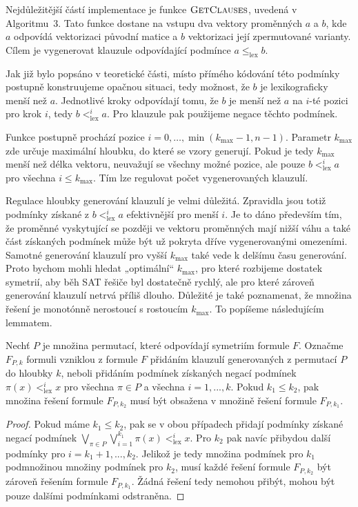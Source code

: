 Nejdůležitější částí implementace je funkce $\textproc{GetClauses}$, uvedená v Algoritmu 3. Tato funkce dostane na vstupu dva vektory proměnných $a$ a $b$, kde $a$ odpovídá vektorizaci původní matice a $b$ vektorizaci její zpermutované varianty. Cílem je vygenerovat klauzule odpovídající podmínce
$a \leq_{\text{lex}} b$.

Jak již bylo popsáno v teoretické části, místo přímého kódování této podmínky postupně konstruujeme opačnou situaci, tedy možnost, že $b$ je lexikograficky menší než $a$. Jednotlivé kroky odpovídají tomu, že $b$ je menší než $a$ na $i$-té pozici pro krok $i$, tedy $b <^i_{\text{lex}} a$. Pro klauzule pak použijeme negace těchto podmínek.

Funkce postupně prochází pozice $i = 0,\ldots,\min(k_{\max}-1,n-1)$. Parametr $k_{\max}$ zde určuje maximální hloubku, do které se vzory generují. Pokud je tedy $k_{\max}$ menší než délka vektoru, neuvažují se všechny možné pozice, ale pouze $b <^i_{\text{lex}} a$ pro všechna $i \leq k_{\max}$. Tím lze regulovat počet vygenerovaných klauzulí.

Regulace hloubky generování klauzulí je velmi důležitá. Zpravidla jsou totiž podmínky získané z $b <^i_{\text{lex}} a$ efektivnější pro menší $i$. Je to dáno především tím, že proměnné vyskytující se později ve vektoru proměnných mají nižší váhu a také část získaných podmínek může být už pokryta dříve vygenerovanými omezeními. Samotné generování klauzulí pro vyšší $k_{\max}$ také vede k delšímu času generování. Proto bychom mohli hledat „optimální“ $k_{\max}$, pro které rozbijeme dostatek symetrií, aby běh SAT řešiče byl dostatečně rychlý, ale pro které zároveň generování klauzulí netrvá příliš dlouho. Důležité je také poznamenat, že množina řešení je monotónně nerostoucí s rostoucím $k_{\max}$. To popíšeme následujícím lemmatem.

\begin{lemma}
Nechť $P$ je množina permutací, které odpovídají symetriím formule $F$. Označme $F_{P,k}$ formuli vzniklou z formule $F$ přidáním klauzulí generovaných z permutací $P$ do hloubky $k$, neboli přidáním podmínek získaných negací podmínek $\pi(x) <^i_{\text{lex}} x$ pro všechna $\pi \in P$ a všechna $i=1,...,k$. Pokud $k_1\leq k_2$, pak množina řešení formule $F_{P,k_2}$ musí být obsažena v množině řešení formule $F_{P,k_1}$.
\end{lemma}

\begin{proof}
Pokud máme $k_1\leq k_2$, pak se v obou případech přidají podmínky získané negací podmínek $\bigvee_{\pi \in P} \bigvee_{i=1}^{k_1} \pi(x) <_{\text{lex}}^{i} x$. Pro $k_2$ pak navíc přibydou další podmínky pro $i=k_1+1,...,k_2$. Jelikož je tedy množina podmínek pro $k_1$ podmnožinou množiny podmínek pro $k_2$, musí každé řešení formule $F_{P,k_2}$ být zároveň řešením formule $F_{P,k_1}$. Žádná řešení tedy nemohou přibýt, mohou být pouze dalšími podmínkami odstraněna.
\end{proof}

